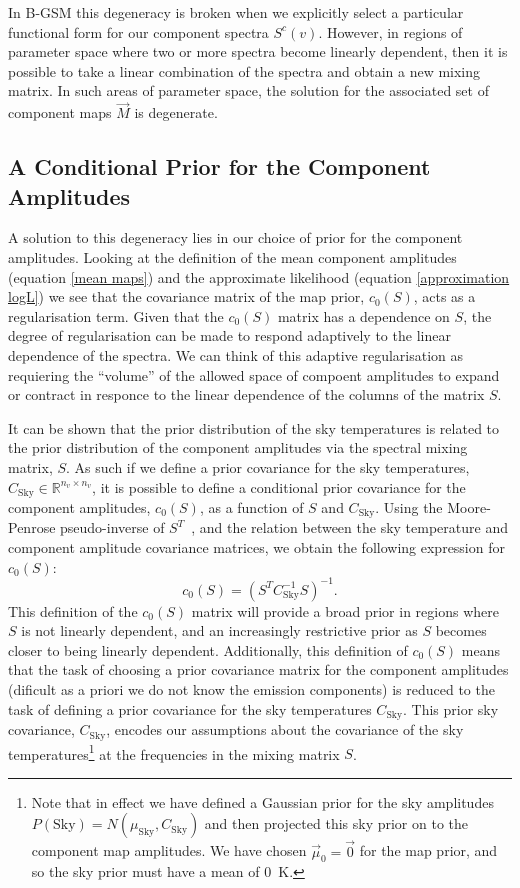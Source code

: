\documentclass[fleqn,usenatbib]{mnras}
\begin{document}
In B-GSM this degeneracy is broken when we explicitly select a particular functional form for our component spectra $S^c(v)$. However, in regions of parameter space where two or more spectra become linearly dependent, then it is possible to take a linear combination of the spectra and obtain a new mixing matrix. In such areas of parameter space, the solution for the associated set of component maps $\Vec{M}$ is degenerate.



\subsection{A Conditional Prior for the Component Amplitudes}\label{conditional marginalisation}
A solution to this degeneracy lies in our choice of prior for the component amplitudes. Looking at the definition of the mean component amplitudes (equation \ref{mean maps}) and the approximate likelihood (equation \ref{approximation logL}) we see that the covariance matrix of the map prior, $c_0(S)$, acts as a regularisation term. Given that the $c_0(S)$ matrix has a dependence on $S$, the degree of regularisation can be made to respond adaptively to the linear dependence of the spectra. We can think of this adaptive regularisation as requiering the ``volume'' of the allowed space of compoent amplitudes to expand or contract in responce to the linear dependence of the columns of the matrix $S$. 

It can be shown that the prior distribution of the sky temperatures is related to the prior distribution of the component amplitudes via the spectral mixing matrix, $S$. As such if we define a prior covariance for the sky temperatures, $C_\mathrm{Sky}\in\mathbb{R}^{n_v\times n_v}$, it is possible to define a conditional prior covariance for the component amplitudes, $c_0(S)$, as a function of $S$ and $C_\mathrm{Sky}$. Using the Moore-Penrose pseudo-inverse of $S^T$~\citep{matrix_cookbook}, and the relation between the sky temperature and component amplitude covariance matrices, we obtain the following expression for $c_0(S)$: 
\begin{equation}
    c_0(S) = \left( S^T C_\mathrm{Sky}^{-1} S \right)^{-1}.
\end{equation}
This definition of the $c_0(S)$ matrix will provide a broad prior in regions where $S$ is not linearly dependent, and an increasingly restrictive prior as $S$ becomes closer to being linearly dependent. Additionally, this definition of $c_0(S)$ means that the task of choosing a prior covariance matrix for the component amplitudes (dificult as a priori we do not know the emission components) is reduced to the task of defining a prior covariance for the sky temperatures $C_\mathrm{Sky}$. This prior sky covariance, $C_\mathrm{Sky}$, encodes our assumptions about the covariance of the sky temperatures\footnote{Note that in effect we have defined a Gaussian prior for the sky amplitudes $P(\mathrm{Sky})=N(\mu_\mathrm{Sky},C_\mathrm{Sky})$ and then projected this sky prior on to the component map amplitudes. We have chosen $\Vec{\mu}_0=\Vec{0}$ for the map prior, and so the sky prior must have a mean of 0~K.} at the frequencies in the mixing matrix $S$.
\end{document}
